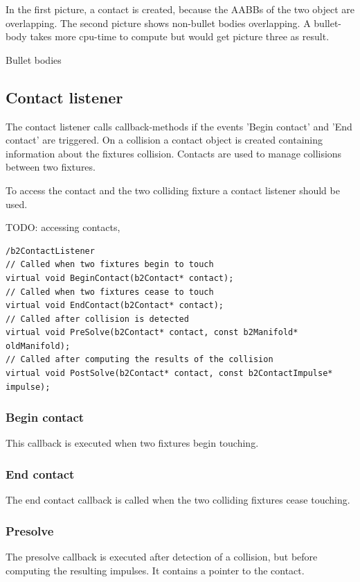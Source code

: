 \documentclass[10pt,a4paper,DIV=11]{scrreprt}
\begin{document}
In the first picture, a contact is created, because the AABBs of the two object are overlapping.
The second picture shows non-bullet bodies overlapping. A bullet-body takes more cpu-time to compute but would get picture three as result.

Bullet bodies

\subsection{Contact listener}
The contact listener calls callback-methods if the events 'Begin contact' and 'End contact' are triggered.
On a collision a contact object is created containing information about the fixtures collision.
Contacts are used to manage collisions between two fixtures.

To access the contact and the two colliding fixture a contact listener should be used.

TODO: accessing contacts, 


\begin{lstlisting}[caption={Contact listener methods},label=lst:collision-contact]
/b2ContactListener
// Called when two fixtures begin to touch
virtual void BeginContact(b2Contact* contact);
// Called when two fixtures cease to touch
virtual void EndContact(b2Contact* contact);
// Called after collision is detected
virtual void PreSolve(b2Contact* contact, const b2Manifold* oldManifold);
// Called after computing the results of the collision
virtual void PostSolve(b2Contact* contact, const b2ContactImpulse* impulse);
\end{lstlisting}

\subsubsection*{Begin contact}
This callback is executed when two fixtures begin touching.

\subsubsection*{End contact}
The end contact callback is called when the two colliding fixtures cease touching.

\subsubsection*{Presolve}
The presolve callback is executed after detection of a collision, but before computing the resulting impulses. It contains a pointer to the contact.
\end{document}
